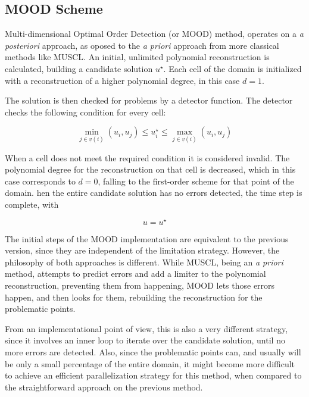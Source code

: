 \subsection{MOOD Scheme}
\label{sec:420}

Multi-dimensional Optimal Order Detection (or MOOD) method, operates on a \textit{a posteriori} approach, as oposed to the \textit{a priori} approach from more classical methods like MUSCL.
An initial, unlimited polynomial reconstruction is calculated, building a candidate solution $u^{\star}$. Each cell of the domain is initialized with a reconstruction of a higher polynomial degree, in this case $d=1$.

The solution is then checked for problems by a detector function. The detector checks the following condition for every cell:

$$ \min_{j \in \underline{v}(i)}(u_i, u_j) \le u_i^{\star} \le \max_{j \in \underline{v}(i)}(u_i, u_j) $$

 
When a cell does not meet the required condition it is considered invalid. The polynomial degree for the reconstruction on that cell is decreased, which in this case corresponds to $d=0$, falling to the first-order scheme for that point of the domain.
 hen the entire candidate solution has no errors detected, the time step is complete, with

$$ u = u^{\star} $$

The initial steps of the MOOD implementation are equivalent to the previous version, since they are independent of the limitation strategy. However, the philosophy of both approaches is different. While MUSCL, being an \textit{a priori} method, attempts to predict errors and add a limiter to the polynomial reconstruction, preventing them from happening, MOOD lets those errors happen, and then looks for them, rebuilding the reconstruction for the problematic points.

From an implementational point of view, this is also a very different strategy, since it involves an inner loop to iterate over the candidate solution, until no more errors are detected. Also, since the problematic points can, and usually will be only a small percentage of the entire domain, it might become more difficult to achieve an efficient parallelization strategy for this method, when compared to the straightforward approach on the previous method.